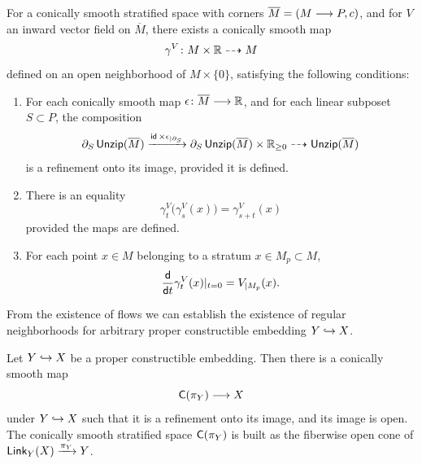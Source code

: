 \begin{proposition}\cite[Lemma~8.1.3]{AFT1}\label{ch4:: def: in flows}
For a conically smooth stratified space with corners $\overline{M} = (M \longrightarrow P,c)$, and for $V$ an inward vector field on $\overline{M}$, there exists a conically smooth map 
\begin{equation}\label{eq:def:in flows}
    \gamma^V \colon M \times \mathbb R \dashrightarrow M
\end{equation}
defined on an open neighborhood of $M\times \{0\}$, satisfying the following conditions:
\begin{enumerate}
    \item For each conically smooth map $\epsilon \colon \overline{M} \longrightarrow \mathbb R$, and for each linear subposet $S\subset P$, the composition 
    \begin{equation}\label{eq:def:in flows:iso}
        \partial_{S}\operatorname{\sf Unzip}(\overline{M}) \xrightarrow{\operatorname{\sf id} \times \epsilon_{|\partial_{S}}} \partial_{S}\operatorname{\sf Unzip}(\overline{M})\times \mathbb R_{\geq 0} \dashrightarrow \operatorname{\sf Unzip}(\overline{M})
    \end{equation}
    is a refinement onto its image, provided it is defined. 
    \item There is an equality 
    \begin{equation}\label{eq:def:in flows:action}
        \gamma^V_{t}\big(\gamma^V_{s}(x)\big) = \gamma^V_{s+t}(x)
    \end{equation}
    provided the maps are defined.
    \item For each point $x\in M$ belonging to a stratum $x\in M_p \subset M$,
    \begin{equation}\label{eq:def:in flows:tangent}
        \frac{\sf d}{{\sf d}t}\gamma_t^{V}(x)|_{t=0} = V_{|M_p}(x).
    \end{equation}
    
\end{enumerate}
\end{proposition}

From the existence of flows we can establish the existence of regular neighborhoods for arbitrary proper constructible embedding $Y\hookrightarrow X$.

\begin{proposition}\cite[Proposition~8.2.5]{AFT1}
    Let $Y\hookrightarrow X$ be a proper constructible embedding. Then there is a conically smooth map 
    \begin{equation}
        \mathsf C(\pi_Y) \longrightarrow X
    \end{equation}
    under $Y\hookrightarrow X$ such that it is a refinement onto its image, and its image is open. The conically smooth stratified space $\mathsf C(\pi_Y)$ is built as the fiberwise open cone of $\operatorname{{\sf Link}}_{Y}(X) \xrightarrow{\pi_Y} Y$.
\end{proposition}

